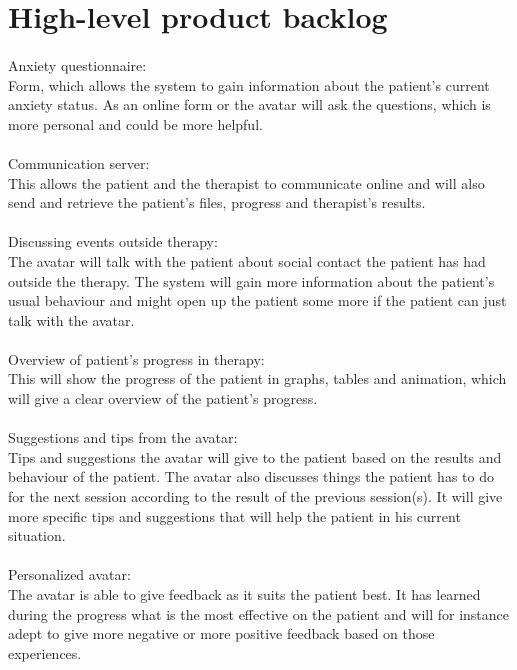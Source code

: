 \section{High-level product backlog}
\paragraph{}
Anxiety questionnaire: \\
Form, which allows the system to gain information about the patient's current anxiety status. As an online form or the \gls{avatar} will ask the questions, which is more personal and could be more helpful.
\paragraph{}
Communication server: \\
This allows the patient and the therapist to communicate online and will also send and retrieve the patient's files, progress and therapist's results.
\paragraph{}
Discussing events outside therapy: \\
The \gls{avatar} will talk with the patient about social contact the patient has had outside the therapy.
The system will gain more information about the patient's usual behaviour and might open up the patient some more if the patient can just talk with the \gls{avatar}.
\paragraph{}
Overview of patient's progress in therapy: \\
This will show the progress of the patient in graphs, tables and animation, which will give a clear overview of the patient's progress. 
\paragraph{}
Suggestions and tips from the \gls{avatar}: \\
Tips and suggestions the \gls{avatar} will give to the patient based on the results and behaviour of the patient. 
The \gls{avatar} also discusses things the patient has to do for the next session according to the result of the previous session(s). It will give more specific tips and suggestions that will help the patient in his current situation.
\paragraph{}
Personalized \gls{avatar}: \\
The \gls{avatar} is able to give feedback as it suits the patient best. It has learned during the progress what is the most effective on the patient and will for instance adept to give more negative or more positive feedback based on those experiences.
